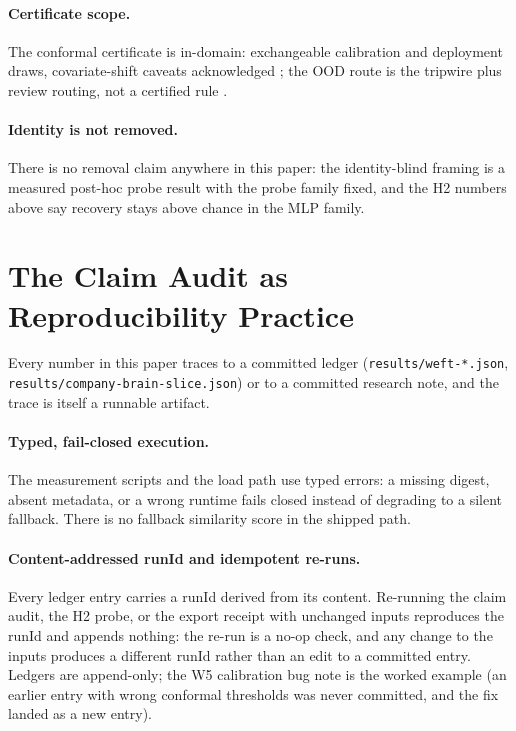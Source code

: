 \documentclass{article}
\begin{document}
\paragraph{Certificate scope.}
The conformal certificate is in-domain: exchangeable calibration and deployment draws, covariate-shift caveats acknowledged \citep{tibshirani2019conformal}; the OOD route is the tripwire plus review routing, not a certified rule \citep{sun2022knnood}.

\paragraph{Identity is not removed.}
There is no removal claim anywhere in this paper: the identity-blind framing is a measured post-hoc probe result with the probe family fixed, and the H2 numbers above say recovery stays above chance in the MLP family.

\section{The Claim Audit as Reproducibility Practice}
\label{sec:audit}

Every number in this paper traces to a committed ledger (\texttt{results/weft-*.json}, \texttt{results/company-brain-slice.json}) or to a committed research note, and the trace is itself a runnable artifact.

\paragraph{Typed, fail-closed execution.}
The measurement scripts and the load path use typed errors: a missing digest, absent metadata, or a wrong runtime fails closed instead of degrading to a silent fallback. There is no fallback similarity score in the shipped path.

\paragraph{Content-addressed runId and idempotent re-runs.}
Every ledger entry carries a runId derived from its content. Re-running the claim audit, the H2 probe, or the export receipt with unchanged inputs reproduces the runId and appends nothing: the re-run is a no-op check, and any change to the inputs produces a different runId rather than an edit to a committed entry. Ledgers are append-only; the W5 calibration bug note is the worked example (an earlier entry with wrong conformal thresholds was never committed, and the fix landed as a new entry).
\end{document}
